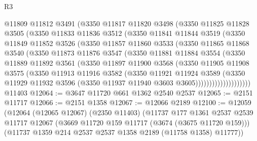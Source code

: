 \begin{lexlean}{R3}
\begin{coremodule}
            @11809
            @11812
            @3491
            (@3350
              @11817
              @11820
              @3498
              (@3350
                @11825
                @11828
                @3505
                (@3350
                  @11833
                  @11836
                  @3512
                  (@3350
                    @11841
                    @11844
                    @3519
                    (@3350
                      @11849
                      @11852
                      @3526
                      (@3350
                        @11857
                        @11860
                        @3533
                        (@3350
                          @11865
                          @11868
                          @3540
                          (@3350
                            @11873
                            @11876
                            @3547
                            (@3350
                              @11881
                              @11884
                              @3554
                              (@3350
                                @11889
                                @11892
                                @3561
                                (@3350
                                  @11897
                                  @11900
                                  @3568
                                  (@3350
                                    @11905
                                    @11908
                                    @3575
                                    (@3350
                                      @11913
                                      @11916
                                      @3582
                                      (@3350
                                        @11921
                                        @11924
                                        @3589
                                        (@3350
                                          @11929
                                          @11932
                                          @3596
                                          (@3350 @11937 @11940 @3603 @3605))))))))))))))))))))
    @11403
@12064 := @3647 @11720 @661 @1362 @2540 @2537
@12065 := @2151 @11717
@12066 := @2151 @1358
@12067 := @12066 @2189
@12100 := @12059
    (@12064
      (@12065 @12067)
      (@2350 @11403)
      (@11737
        @177
        @1361
        @2537
        @2539
        @11717
        @12067
        (@3669 @11720 @159 @11717 (@3674 (@3675 @11720 @159)))
        (@11737 @1359 @214 @2537 @2537 @1358 @2189 (@11758 @1358) @11777))

\end{coremodule}
\end{lexlean}
